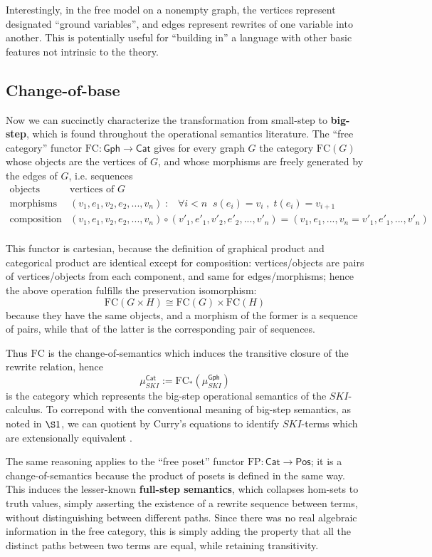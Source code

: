 \documentclass{amsart}
\theoremstyle{definition}
\newcommand{\Gph}{\mathsf{Gph}}
\newcommand{\Cat}{\mathsf{Cat}}
\newcommand{\Pos}{\mathsf{Pos}}
\newcommand{\FC}{\mathrm{FC}}
\newcommand{\FP}{\mathrm{FP}}
\newcommand{\maps}{\colon}
\begin{document}
Interestingly, in the free model on a nonempty graph, the vertices represent designated ``ground variables'', and edges represent rewrites of one variable into another. This is potentially useful for ``building in'' a language with other basic features not intrinsic to the theory.

\subsection{Change-of-base}
Now we can succinctly characterize the transformation from small-step to \textbf{big-step}, which is found throughout the operational semantics literature. The ``free category'' functor $\FC\maps \Gph \to \Cat$ gives for every graph $G$ the category $\FC(G)$ whose objects are the vertices of $G$, and whose morphisms are freely generated by the edges of $G$, i.e. sequences 
\[\begin{array}{rl}
\text{objects} & \text{vertices of } G\\
\text{morphisms} & (v_1,e_1,v_2,e_2,...,v_n) \; : \; \;\; \forall i<n \;\; s(e_i)=v_i \; , \; t(e_i)=v_{i+1}\\
\text{composition} & (v_1,e_1,v_2,e_2,...,v_n) \circ (v'_1,e'_1,v'_2,e'_2,...,v'_n) = (v_1,e_1,...,v_n=v'_1,e'_1,...,v'_n)\\
\end{array}\]

This functor is cartesian, because the definition of graphical product and categorical product are identical except for composition: vertices/objects are pairs of vertices/objects from each component, and same for edges/morphisms; hence the above operation fulfills the preservation isomorphism: $$\FC(G\times H) \cong \FC(G)\times \FC(H)$$ because they have the same objects, and a morphism of the former is a sequence of pairs, while that of the latter is the corresponding pair of sequences.

Thus $\FC$ is the change-of-semantics which induces the transitive closure of the rewrite relation, hence $$\mu_{SKI}^\Cat := \FC_*(\mu_{SKI}^\Gph)$$ is the category which represents the big-step operational semantics of the $SKI$-calculus. To correpond with the conventional meaning of big-step semantics, as noted in $\S1$, we can quotient by Curry's equations to identify $SKI$-terms which are extensionally equivalent \cite{barendregt}.

The same reasoning applies to the ``free poset'' functor $\FP\maps \Cat \to \Pos$; it is a change-of-semantics because the product of posets is defined in the same way. This induces the lesser-known \textbf{full-step semantics}, which collapses hom-sets to truth values, simply asserting the existence of a rewrite sequence between terms, without distinguishing between different paths. Since there was no real algebraic information in the free category, this is simply adding the property that all the distinct paths between two terms are equal, while retaining transitivity.
\end{document}
